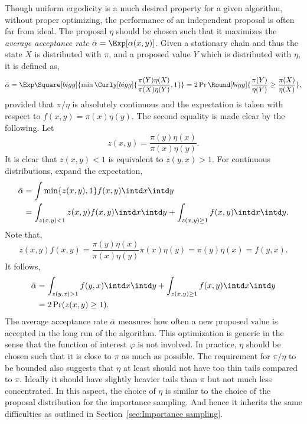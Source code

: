 Though uniform ergodicity is a much desired property for a given algorithm,
without proper optimizing, the performance of an independent proposal is
often far from ideal. The proposal $\eta$ should be chosen such that it
maximizes the \emph{average acceptance rate} $\bar\alpha =
\Exp[\alpha(x,y)]$. Given a stationary chain and thus the state $X$ is
distributed with $\pi$, and a proposed value $Y$ which is distributed with
$\eta$, it is defined as,
\begin{equation}
  \bar\alpha
  = \Exp\Square[bigg]{\min\Curly[bigg]{\frac{\pi(Y)\eta(X)}{\pi(X)\eta(Y)},1}}
  = 2\Pr\Round[bigg]{\frac{\pi(Y)}{\eta(Y)}\ge\frac{\pi(X)}{\eta(X)}},
\end{equation}
provided that $\pi/\eta$ is absolutely continuous and the expectation is taken
with respect to $f(x,y) = \pi(x)\eta(y)$. The second equality is made clear by
the following. Let
\begin{equation*}
  z(x,y) = \frac{\pi(y)\eta(x)}{\pi(x)\eta(y)}.
\end{equation*}
It is clear that $z(x,y) < 1$ is equivalent to $z(y,x)>1$. For continuous
distributions, expand the expectation,
\begin{align*}
  \bar\alpha
  &= \int \min\{z(x,y),1\} f(x,y)\intd x \intd y \\
  &= \int_{z(x,y) < 1} z(x,y)f(x,y) \intd x \intd y
  + \int_{z(x,y)\ge1} f(x,y)\intd x \intd y. \\
\end{align*}
Note that,
\begin{equation*}
  z(x,y)f(x,y)
  = \frac{\pi(y)\eta(x)}{\pi(x)\eta(y)}\pi(x)\eta(y)
  = \pi(y)\eta(x)
  = f(y,x).
\end{equation*}
It follows,
\begin{align*}
  \bar\alpha
  &= \int_{z(y,x) > 1} f(y, x) \intd x \intd y
  + \int_{z(x,y)\ge1} f(x,y) \intd x \intd y\\
  &= 2\Pr(z(x,y)\ge1).
\end{align*}
The average acceptance rate $\bar\alpha$ measures how often a new proposed
value is accepted in the long run of the algorithm. This optimization is
generic in the sense that the function of interest $\varphi$ is not involved.
In practice, $\eta$ should be chosen such that it is close to $\pi$ as much
as possible. The requirement for $\pi/\eta$ to be bounded also suggests that
$\eta$ at least should not have too thin tails compared to $\pi$. Ideally it
should have slightly heavier tails than $\pi$ but not much less concentrated.
In this aspect, the choice of $\eta$ is similar to the choice of the proposal
distribution for the importance sampling. And hence it inherits the same
difficulties as outlined in Section~\ref{sec:Importance sampling}.

